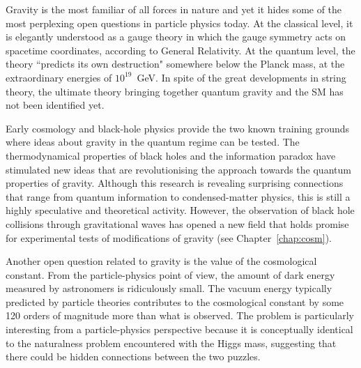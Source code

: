 \documentclass[../report.tex]{subfiles}
\begin{document}
\medskip
{}

\smallskip
\noindent
Gravity is the most familiar of all forces in nature and yet it hides some of the most perplexing open questions in particle physics today. At the classical level, it is elegantly understood as a gauge theory in which the gauge symmetry acts on spacetime coordinates, according to General Relativity. At the quantum level, the theory ``predicts its own destruction" somewhere below the Planck mass, at the extraordinary energies of $10^{19}$~GeV. In spite of the great developments in string theory, the ultimate theory bringing together quantum gravity and the SM has not been identified yet.

Early cosmology and black-hole physics provide the two known training grounds where ideas about gravity in the quantum regime can be tested. The thermodynamical properties of black holes and the information paradox have stimulated new ideas that are revolutionising the approach towards the quantum properties of gravity. Although this research is revealing surprising connections that range from quantum information to condensed-matter physics, this is still a highly speculative and theoretical activity. However, the observation of black hole collisions through gravitational waves has opened a new field that holds promise for experimental tests of modifications of gravity (see Chapter~\ref{chap:cosm}).

Another open question related to gravity is the value of the cosmological constant. From the particle-physics point of view, the amount of dark energy measured by astronomers is ridiculously small. The vacuum energy typically predicted by particle theories contributes to the cosmological constant by some 120 orders of magnitude more than what is observed. The problem is particularly interesting from a particle-physics perspective because it is conceptually identical to the naturalness problem encountered with the Higgs mass, suggesting that there could be hidden connections between the two puzzles.

\medskip
{}
\end{document}
